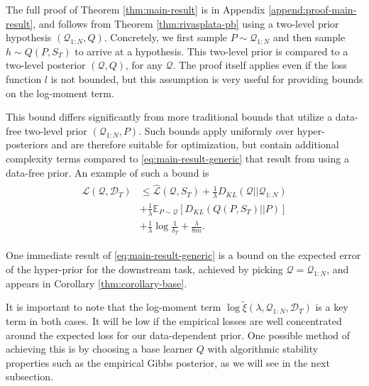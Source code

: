\documentclass[letterpaper]{article} %
\theoremstyle{definition}
\newcommand{\Expect}[2]{\mathbb{E}_{#1}\left [#2 \right ]}
\begin{document}
The full proof of Theorem \ref{thm:main-result} is in Appendix \ref{append:proof-main-result}, and follows from Theorem \ref{thm:rivasplata-pb} using a two-level prior hypothesis $(\mathcal{Q}_{1:N}, Q)$. Concretely, we first sample $P\sim \mathcal{Q}_{1:N}$ and then sample $h\sim Q(P, S_T)$ to arrive at a hypothesis. This two-level prior is compared to a two-level posterior $(\mathcal{Q}, Q)$, for any $\mathcal{Q}$. The proof itself applies even if the loss function $l$ is not bounded, but this assumption is very useful for providing bounds on the log-moment term.

This bound differs significantly from more traditional bounds that utilize a data-free two-level prior $(\mathcal{Q}_{1:N}, P)$. Such bounds apply uniformly over hyper-posteriors and are therefore suitable for optimization, but contain additional complexity terms compared to \eqref{eq:main-result-generic} that result from using a data-free prior. An example of such a bound is
%
\begin{align} \label{eq:main-result-generic-datafree}
\begin{split}
\mathcal{L}(\mathcal{Q}, \mathcal{D}_T) &\leq \hat{\mathcal{L}}(\mathcal{Q}, S_T) 
+ \frac{1}{\lambda}D_{KL}(\mathcal{Q}||\mathcal{Q}_{1:N}) \\
&+ \frac{1}{\lambda}\Expect{P\sim \mathcal{Q}}{D_{KL}(Q(P,S_T)||P)}\\
&+\frac{1}{\lambda}\log\frac{1}{\delta_T}+\frac{\lambda}{8m} .
\end{split}
\end{align}


One immediate result of \eqref{eq:main-result-generic} is a bound on the expected error of the hyper-prior for the downstream task, achieved by picking $\mathcal{Q}=\mathcal{Q}_{1:N}$, and appears in Corollary \ref{thm:corollary-base}.

It is important to note that the log-moment term $\log\tilde{\xi}(\lambda,\mathcal{Q}_{1:N},\mathcal{D}_T)$ is a key term in both cases. It will be low if the empirical losses are well concentrated around the expected loss for our data-dependent prior. One possible method of achieving this is by choosing a base learner $Q$ with algorithmic stability properties such as the empirical Gibbs posterior, as we will see in the next subsection.
\end{document}
